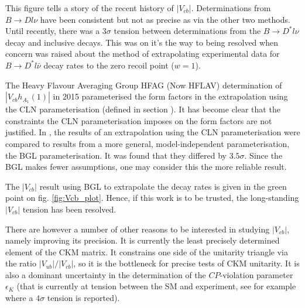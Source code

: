 This figure tells a story of the recent history of $|V_{cb}|$. Determinations from $B\to Dl\nu$ have been consistent but not as precise as via the other two methods. Until recently, there was a $3\sigma$ tension between determinations from the $B\to D^* l\nu$ decay and inclusive decays. This was on it's the way to being resolved when concern was raised about the method of extrapolating experimental data for $B\to D^*l\bar{\nu}$ decay rates to the zero recoil point ($w=1$).

The Heavy Flavour Averaging Group HFAG (Now HFLAV) determination of $|V_{cb}h_{A_1}(1)|$ in 2015 parameterised the form factors in the extrapolation using the CLN parameterisation (defined in section {}). It has become clear that the constraints the CLN parameterisation imposes on the form factors are not justified. In \cite{Bigi:2017njr,Grinstein:2017nlq}, the results of an extrapolation using the CLN parameterisation were compared to results from a more general, model-independent parameterisation, the BGL parameterisation. It was found that they differed by $3.5\sigma$. Since the BGL makes fewer assumptions, one may consider this the more reliable result.

The $|V_{cb}|$ result using BGL to extrapolate the decay rates is given in the green point on fig. \ref{fig:Vcb_plot}. Hence, if this work is to be trusted, the long-standing $|V_{cb}|$ tension has been resolved.

There are however a number of other reasons to be interested in studying $|V_{cb}|$, namely improving its precision. It is currently the least precisely determined element of the CKM matrix. It constrains one side of the unitarity triangle via the ratio $|V_{ub}|/|V_{cb}|$, so it is the bottleneck for precise tests of CKM unitarity. It is also a dominant uncertainty in the determination of the $CP$-violation parameter $\epsilon_K$ (that is currently at tension between the SM and experiment, see for example \cite{Bailey:2018feb} where a $4\sigma$ tension is reported).


